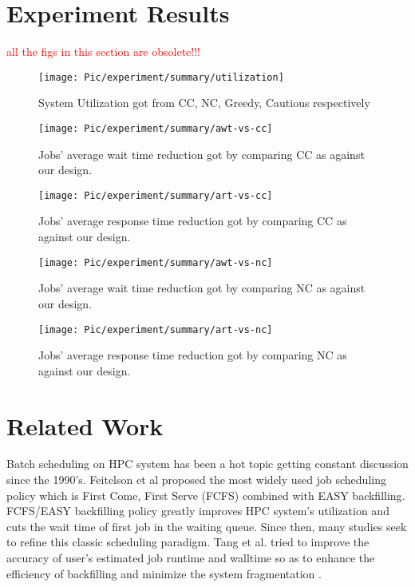 \documentclass[conference]{IEEEtran}
\begin{document}
\section{Experiment Results}
\label{sec:scheduling results}

\textcolor{red}{all the figs in this section are obsolete!!!}

\begin{figure}[h!] 
  \centering
  \texttt{[image: Pic/experiment/summary/utilization]}
  \caption{System Utilization got from CC, NC, Greedy, Cautious respectively}
  \label{fig: uti}
\end{figure}


\begin{figure}[h!] 
  \centering
  \texttt{[image: Pic/experiment/summary/awt-vs-cc]}
  \caption{Jobs' average wait time reduction got by comparing CC as against our design.}
  \label{fig: uti}
\end{figure}


\begin{figure}[h!] 
  \centering
  \texttt{[image: Pic/experiment/summary/art-vs-cc]}
  \caption{Jobs' average response time reduction got by comparing CC as against our design.}
  \label{fig: uti}
\end{figure}

\begin{figure}[h!] 
  \centering
  \texttt{[image: Pic/experiment/summary/awt-vs-nc]}
  \caption{Jobs' average wait time reduction got by comparing NC as against our design.}
  \label{fig: uti}
\end{figure}


\begin{figure}[h!] 
  \centering
  \texttt{[image: Pic/experiment/summary/art-vs-nc]}
  \caption{Jobs' average response time reduction got by comparing NC as against our design.}
  \label{fig: uti}
\end{figure}



\section{Related Work}
\label{sec:related_work}
Batch scheduling on HPC system has been a hot topic getting constant discussion since the 1990's.
Feitelson et al proposed the most widely used job scheduling policy which is First Come, First Serve (FCFS) combined with 
EASY backfilling\cite{feit}. FCFS/EASY backfilling policy greatly improves HPC system's utilization and cuts the wait time 
of first job in the waiting queue. Since then, many studies seek to refine this classic scheduling paradigm. Tang et al. 
tried to improve the accuracy of user's estimated job runtime and walltime so as to enhance the efficiency of backfilling and  minimize the system fragmentation\cite{wei-ipdps2010} \cite{wei-jpdc2013} \cite{wei-ipdps2011}. %
\end{document}
